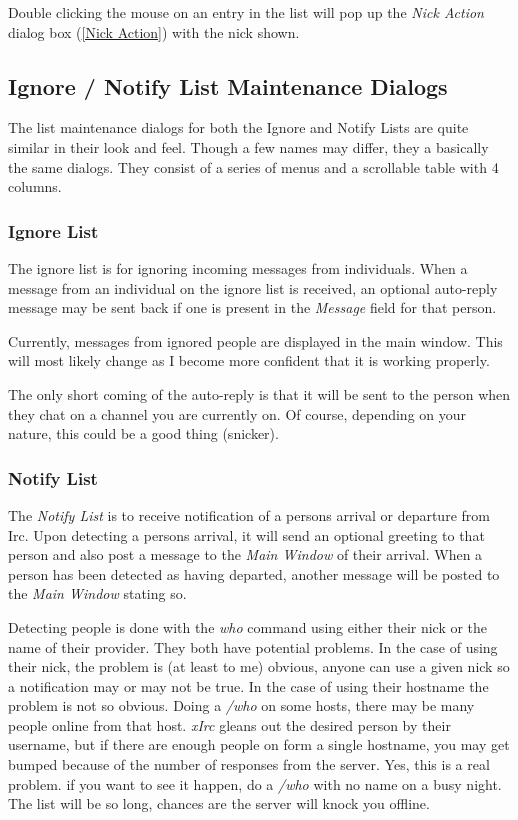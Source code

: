 \documentclass[titlepage]{article}
\begin{document}
Double clicking the mouse on an entry in the list will pop up the
\emph{Nick Action} dialog box (\ref{Nick Action}) with the nick shown.

\subsection{Ignore / Notify List Maintenance Dialogs}
The list maintenance dialogs for both the Ignore and Notify Lists are quite
similar in their look and feel. Though a few names may differ, they a
basically the same dialogs. They consist of a series of menus and a
scrollable table with 4 columns.

\subsubsection{Ignore List}\label{Ignore List}
The ignore list is for ignoring incoming messages from individuals. When a
message from an individual on the ignore list is received, an optional
auto-reply message may be sent back if one is present in the \emph{Message}
field for that person. 

Currently, messages from ignored people are displayed in the main window.
This will most likely change as I become more confident that it is working
properly.

The only short coming of the auto-reply is that it will be sent to the
person when they chat on a channel you are currently on. Of course,
depending on your nature, this could be a good thing (snicker).

\subsubsection{Notify List}\label{Notify List}
The \emph{Notify List} is to receive notification of a persons arrival or
departure from Irc. Upon detecting a persons arrival, it will send an
optional greeting to that person and also post a message to the \emph{Main
Window} of their arrival. When a person has been detected as having
departed, another message will be posted to the \emph{Main Window} stating
so.

Detecting people is done with the \emph{who} command using either their
nick or the name of their provider. They both have potential problems. In
the case of using their nick, the problem is (at least to me) obvious,
anyone can use a given nick so a notification may or may not be true. In
the case of using their hostname the problem is not so obvious. Doing a
\emph{/who} on some hosts, there may be many people online from that host.
\emph{xIrc} gleans out the desired person by their username, but if there
are enough people on form a single hostname, you may get bumped because of
the number of responses from the server. Yes, this is a real problem. if
you want to see it happen, do a \emph{/who} with no name on a busy night.
The list will be so long, chances are the server will knock you offline.
\end{document}
